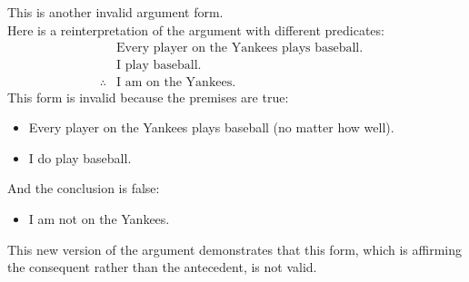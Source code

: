 \documentclass{article}
\begin{document}
\subsection{}
This is another invalid argument form.\\ Here is a reinterpretation of the
argument with different predicates:
\begin{align*}
               & \text{Every player on the Yankees plays baseball.} & \\
               & \text{I play baseball.}                            & \\
    \therefore & \text{I am on the Yankees.}                        &
\end{align*}
This form is invalid because the premises are true:
\begin{itemize}
    \item Every player on the Yankees plays baseball (no matter how well).
    \item I do play baseball.
\end{itemize}
And the conclusion is false:
\begin{itemize}
    \item I am not on the Yankees.
\end{itemize}
This new version of the argument demonstrates that this form, which is affirming the consequent rather than the antecedent, is not valid.
\end{document}
